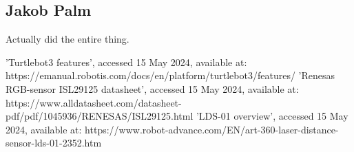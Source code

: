 \documentclass[conference]{IEEEtran}
\begin{document}
\subsection{Jakob Palm}
Actually did the entire thing.

\begin{thebibliography}{00}
 'Turtlebot3 features', accessed 15 May 2024, available at: https://emanual.robotis.com/docs/en/platform/turtlebot3/features/
 'Renesas RGB-sensor ISL29125 datasheet', accessed 15 May 2024, available at: https://www.alldatasheet.com/datasheet-pdf/pdf/1045936/RENESAS/ISL29125.html
 'LDS-01 overview', accessed 15 May 2024, available at: https://www.robot-advance.com/EN/art-360-laser-distance-sensor-lds-01-2352.htm
\end{thebibliography}
\end{document}
